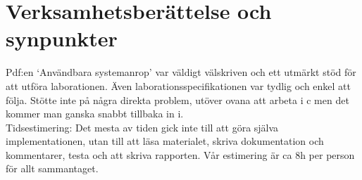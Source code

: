 \documentclass[a4paper]{article}
\begin{document}
\section*{Verksamhetsberättelse och synpunkter}
Pdf:en ‘Användbara systemanrop’ var väldigt välskriven och ett utmärkt stöd för att utföra laborationen. Även laborationsspecifikationen var tydlig och enkel att följa. Stötte inte på några direkta problem, utöver ovana att arbeta i c men det kommer man ganska snabbt tillbaka in i.
\\
Tidsestimering: Det mesta av tiden gick inte till att göra själva implementationen, utan till att läsa materialet, skriva dokumentation och kommentarer, testa och att skriva rapporten. Vår estimering är ca 8h per person för allt sammantaget.
\end{document}

